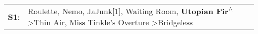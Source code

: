\begin{supertabular}{p{0.03\textwidth}p{0.92\textwidth}}
 \textbf{S1}:  &  Roulette\textsuperscript{}, \enspace Nemo\textsuperscript{}, \enspace JaJunk[1]\textsuperscript{}, \enspace Waiting Room\textsuperscript{}, \enspace \textbf{Utopian Fir\textsuperscript{$\wedge$}} \textgreater \enspace Thin Air\textsuperscript{}, \enspace Miss Tinkle's Overture\textsuperscript{} \textgreater \enspace Bridgeless\textsuperscript{}  \enspace  \\
\end{supertabular}
